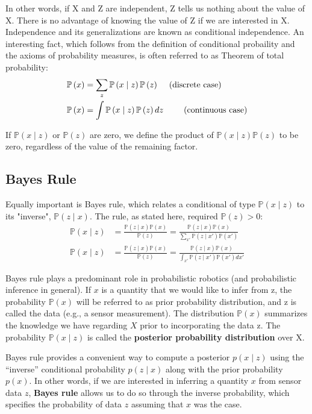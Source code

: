 \documentclass[14pt,letterpaper]{article}
\theoremstyle{definition}
\newcommand{\prob}[1]{\mathbb{P}\left(#1\right)}
\begin{document}
In other words, if X and Z are independent, Z tells us nothing about the value of X. There is no advantage of knowing the value of Z if we are interested in X.
Independence and its generalizations are known as conditional independence.
An interesting fact, which follows from the definition of conditional probaility and the axioms of probability measures, is often referred to as Theorem of total probability:
\begin{align}
  \prob{x} &= \sum_{z}{\prob{x \mid z}\prob{z}}  \hspace{5mm}  \text{(discrete case)}\\
  \prob{x} &= \int{\prob{x \mid z}\prob{z} dz} \hspace{8.5mm} \text{(continuous case)}
\end{align}

If $\prob{x \mid z}$ or $\prob{z}$ are zero, we define the product of $\prob{x \mid z}\prob{z}$ to be zero, regardless of the value of the remaining factor.

\subsection{Bayes Rule}
Equally important is Bayes rule, which relates a conditional of type $\prob{x \mid z}$ to its "inverse", $\prob{z \mid x}$.
The rule, as stated here, required $\prob{z}>0$:
\begin{align}
  \prob{x \mid z} &= \frac{\prob{z \mid x}\prob{x}}{\prob{z}} = \frac{\prob{z \mid x}\prob{x}}{\sum_{x'}{\prob{z \mid x'}\prob{x'}}} \\
  \prob{x \mid z} &= \frac{\prob{z \mid x}\prob{x}}{\prob{z}} = \frac{\prob{z \mid x}\prob{x}}{\int_{x'}{\prob{z \mid x'}\prob{x'}dx'}}
\end{align}

Bayes rule plays a predominant role in probabilistic robotics (and probabilistic inference in general). If $x$ is a quantity that we would like to infer from z, the probability $\prob{x}$ will be referred to as prior probability distribution, and z is called the data (e.g., a sensor measurement).
The distribution $\prob{x}$ summarizes the knowledge we have regarding $X$ prior to incorporating the data z. The probability $\prob{x \mid z}$ is called the \textbf{posterior probability distribution} over X.

\vspace{2mm}
Bayes rule provides a convenient way to compute a posterior $p(x \mid z)$ using the “inverse” conditional probability $p(z \mid x)$ along with the prior probability $p(x)$.
In other words, if we are interested in inferring a quantity $x$ from sensor data $z$, \textbf{Bayes rule} allows us to do so through the inverse probability, which specifies the probability of data $z$ assuming that $x$ was the case.
\end{document}
